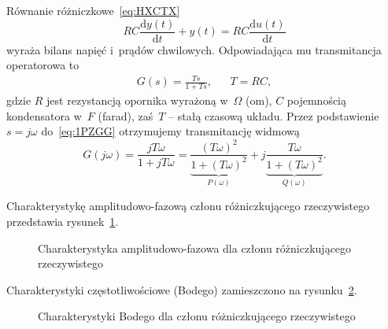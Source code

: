 \documentclass[paper=a4,DIV=12]{lpas}
\newcommand{\od}[2]{\frac{\mathrm{d}#1}{\mathrm{d}#2}}
\begin{document}
\begin{appendices}
  Równanie różniczkowe~\eqref{eq:HXCTX}
  \begin{equation}
    R C \od{y(t)}{t} + y(t) = R C \od{u(t)}{t}
    \label{eq:HXCTX}
  \end{equation}
  wyraża bilans napięć i~prądów chwilowych. Odpowiadająca mu transmitancja
  operatorowa to
  \begin{equation}
    \begin{aligned}
      &
      G(s) = \frac{Ts}{1 + Ts},
      & &
      T = R C,
      &
    \end{aligned}
    \label{eq:1PZGG}
  \end{equation}
  gdzie $R$ jest rezystancją opornika wyrażoną w~$\Omega$ (om), $C$
  pojemnością kondensatora w~$F$ (farad), zaś~$T$ -- stałą czasową układu.
  Przez podstawienie $s=j\omega$ do~\eqref{eq:1PZGG} otrzymujemy transmitancję
  widmową
  \begin{equation}
      G(j\omega)
      = \frac{jT\omega}{1 + j T\omega}
      = \underbrace{\frac{(T\omega)^2}{1 + (T\omega)^2}}_{P(\omega)}
      + j \underbrace{\frac{T\omega}{1 + (T\omega)^2}}_{Q(\omega)}.
    \label{eq:9KF4R}
  \end{equation}

  Charakterystykę amplitudowo-fazową członu różniczkującego
  rzeczywistego przedstawia rysunek~\ref{fig:4HNG2}.
  \begin{figure}[H]
    \centering
    
    \caption{Charakterystyka amplitudowo-fazowa dla członu różniczkującego rzeczywistego}
    \label{fig:4HNG2}
  \end{figure}

  Charakterystyki częstotliwościowe (Bodego) zamieszczono na rysunku~\ref{fig:YZX1R}.
  \begin{figure}[H]
    \centering
    
    \caption{Charakterystyki Bodego dla członu różniczkującego rzeczywistego}
    \label{fig:YZX1R}
  \end{figure}


\end{appendices}
\end{document}
